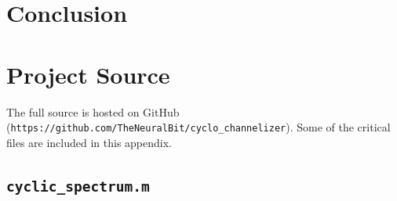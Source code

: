 \documentclass[12pt]{report}
\begin{document}
\chapter{Conclusion}
\label{sec:conclusion}


%
%

%



\nocite{*}


%

\appendix

\chapter{Project Source}
\label{sec:source}
The full source is hosted on GitHub
(\texttt{https://github.com/TheNeuralBit/cyclo\_channelizer}). Some of the
critical files are included in this appendix.

\section{\texttt{cyclic\_spectrum.m}}

\end{document}
